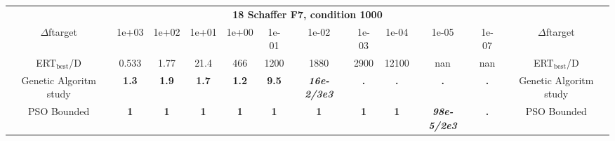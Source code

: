 \begin{tabular}{cccccccccccc}
 & \multicolumn{10}{c}{{\normalsize \textbf{18 Schaffer F7, condition 1000}}}\\
$\Delta$ftarget& 1e+03& 1e+02& 1e+01& 1e+00& 1e-01& 1e-02& 1e-03& 1e-04& 1e-05& 1e-07 & $\Delta$ftarget \\
ERT$_{\textrm{best}}$/D& 0.533& 1.77& 21.4& 466& 1200& 1880& 2900& 12100& nan& nan & ERT$_{\textrm{best}}$/D \\
\hline
Genetic Algoritm study & \textbf{1.3} & \textbf{1.9} & \textbf{1.7} & \textbf{1.2} & \textbf{9.5} & \textbf{\textit{16e-2}\textit{/3e3}} & \textbf{.} & \textbf{.} & \textbf{.} & \textbf{.} & Genetic Algoritm study \cite{add_an_entry_for_Genetic Algoritm study_in_bbob.bib}\\
PSO Bounded & \textbf{1} & \textbf{1} & \textbf{1} & \textbf{1} & \textbf{1} & \textbf{1} & \textbf{1} & \textbf{1} & \textbf{\textit{98e-5}\textit{/2e3}} & \textbf{.} & PSO Bounded \cite{add_an_entry_for_PSO Bounded_in_bbob.bib}
\end{tabular}
